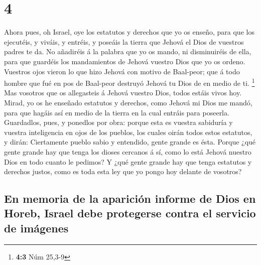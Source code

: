 \hypertarget{section-3}{%
\section{4}\label{section-3}}

 Ahora pues, oh Israel, oye los estatutos y derechos que
yo os enseño, para que los ejecutéis, y viváis, y entréis, y poseáis la
tierra que Jehová el Dios de vuestros padres te da.  No
añadiréis á la palabra que yo os mando, ni disminuiréis de ella, para
que guardéis los mandamientos de Jehová vuestro Dios que yo os ordeno.
 Vuestros ojos vieron lo que hizo Jehová con motivo de
Baal-peor; que á todo hombre que fué en pos de Baal-peor destruyó Jehová
tu Dios de en medio de ti. \footnote{\textbf{4:3} Núm 25,3-9}
 Mas vosotros que os allegasteis á Jehová vuestro Dios,
todos estáis vivos hoy.  Mirad, yo os he enseñado
estatutos y derechos, como Jehová mi Dios me mandó, para que hagáis así
en medio de la tierra en la cual entráis para poseerla. 
Guardadlos, pues, y ponedlos por obra: porque esta es vuestra sabiduría
y vuestra inteligencia en ojos de los pueblos, los cuales oirán todos
estos estatutos, y dirán: Ciertamente pueblo sabio y entendido, gente
grande es ésta.  Porque ¿qué gente grande hay que tenga
los dioses cercanos á sí, como lo está Jehová nuestro Dios en todo
cuanto le pedimos?  Y ¿qué gente grande hay que tenga
estatutos y derechos justos, como es toda esta ley que yo pongo hoy
delante de vosotros?

\hypertarget{en-memoria-de-la-apariciuxf3n-informe-de-dios-en-horeb-israel-debe-protegerse-contra-el-servicio-de-imuxe1genes}{%
\subsection{En memoria de la aparición informe de Dios en Horeb, Israel
debe protegerse contra el servicio de
imágenes}\label{en-memoria-de-la-apariciuxf3n-informe-de-dios-en-horeb-israel-debe-protegerse-contra-el-servicio-de-imuxe1genes}}

